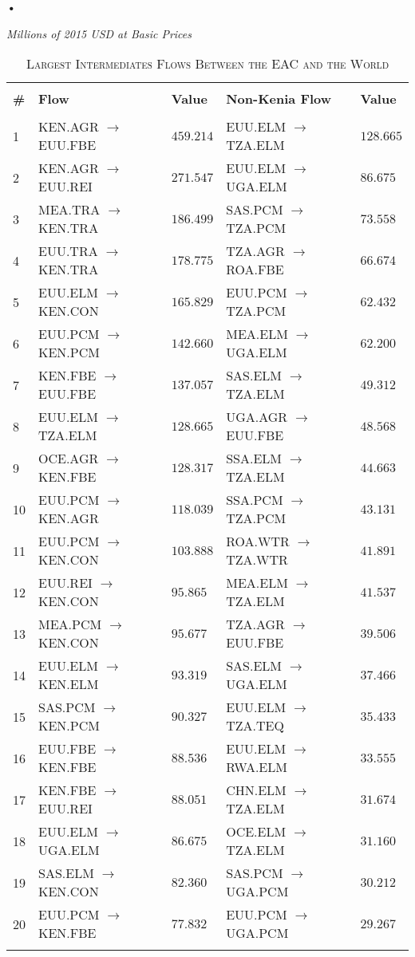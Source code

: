 \textbf{\textbf{•}}\documentclass[a4paper]{article}
\begin{document}
\begin{table}[!htbp] \centering 
  \caption{\textsc{Largest Intermediates Flows Between the EAC and the World}} 
  \small{\textit{Millions of 2015 USD at Basic Prices}}
  \label{tab:weaclfl} 
\begin{tabular}{@{\extracolsep{5pt}} lllll} 
\\[-1.8ex]\hline 
\hline \\[-1.8ex] 
\textbf{\#} & \textbf{Flow} & \textbf{Value} & \textbf{Non-Kenia Flow} & \textbf{Value} \\ 
\hline \\[-1.8ex] 
1 & KEN.AGR $\to$  EUU.FBE & $459.214$ & EUU.ELM $\to$  TZA.ELM & $128.665$ \\ 
2 & KEN.AGR $\to$  EUU.REI & $271.547$ & EUU.ELM $\to$  UGA.ELM & $86.675$ \\ 
3 & MEA.TRA $\to$  KEN.TRA & $186.499$ & SAS.PCM $\to$  TZA.PCM & $73.558$ \\ 
4 & EUU.TRA $\to$  KEN.TRA & $178.775$ & TZA.AGR $\to$  ROA.FBE & $66.674$ \\ 
5 & EUU.ELM $\to$  KEN.CON & $165.829$ & EUU.PCM $\to$  TZA.PCM & $62.432$ \\ 
6 & EUU.PCM $\to$  KEN.PCM & $142.660$ & MEA.ELM $\to$  UGA.ELM & $62.200$ \\ 
7 & KEN.FBE $\to$  EUU.FBE & $137.057$ & SAS.ELM $\to$  TZA.ELM & $49.312$ \\ 
8 & EUU.ELM $\to$  TZA.ELM & $128.665$ & UGA.AGR $\to$  EUU.FBE & $48.568$ \\ 
9 & OCE.AGR $\to$  KEN.FBE & $128.317$ & SSA.ELM $\to$  TZA.ELM & $44.663$ \\ 
10 & EUU.PCM $\to$  KEN.AGR & $118.039$ & SSA.PCM $\to$  TZA.PCM & $43.131$ \\ 
11 & EUU.PCM $\to$  KEN.CON & $103.888$ & ROA.WTR $\to$  TZA.WTR & $41.891$ \\ 
12 & EUU.REI $\to$  KEN.CON & $95.865$ & MEA.ELM $\to$  TZA.ELM & $41.537$ \\ 
13 & MEA.PCM $\to$  KEN.CON & $95.677$ & TZA.AGR $\to$  EUU.FBE & $39.506$ \\ 
14 & EUU.ELM $\to$  KEN.ELM & $93.319$ & SAS.ELM $\to$  UGA.ELM & $37.466$ \\ 
15 & SAS.PCM $\to$  KEN.PCM & $90.327$ & EUU.ELM $\to$  TZA.TEQ & $35.433$ \\ 
16 & EUU.FBE $\to$  KEN.FBE & $88.536$ & EUU.ELM $\to$  RWA.ELM & $33.555$ \\ 
17 & KEN.FBE $\to$  EUU.REI & $88.051$ & CHN.ELM $\to$  TZA.ELM & $31.674$ \\ 
18 & EUU.ELM $\to$  UGA.ELM & $86.675$ & OCE.ELM $\to$  TZA.ELM & $31.160$ \\ 
19 & SAS.ELM $\to$  KEN.CON & $82.360$ & SAS.PCM $\to$  UGA.PCM & $30.212$ \\ 
20 & EUU.PCM $\to$  KEN.FBE & $77.832$ & EUU.PCM $\to$  UGA.PCM & $29.267$ \\ 
\hline \\[-1.8ex] 
\end{tabular} 
\end{table} 
\end{document}
